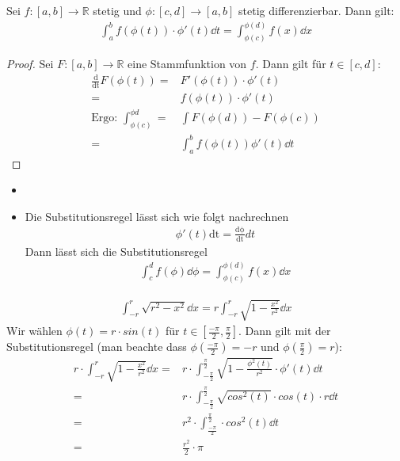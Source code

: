 \begin{Satz}{\label{vl_12_satz_04}
	Sei $f: [a,b] \rightarrow \mathbb{R}$ stetig und $\phi: [c,d] \rightarrow [a,b]$ 
	stetig differenzierbar. Dann gilt:
	\begin{align*}
		\int_a^b f(\phi(t))\cdot\phi'(t)\dd{t} = \int_{\phi(c)}^{\phi(d)} 
		f(x) \dd{x}
	\end{align*}	 
}\end{Satz}


\begin{proof}
	Sei $F : [a,b] \rightarrow \mathbb{R}$ eine Stammfunktion von $f$. Dann gilt für 
	$t \in [c,d]$:
	\begin{align*}
		\frac{\mathrm{d}}{\mathrm{dt}}F(\phi(t)) = &  F'(\phi(t)) \cdot \phi'(t) \\
		= & f(\phi(t))\cdot \phi'(t) \\
		\text{Ergo: } \int_{\phi(c)}^{\phi{d}} = & \int F(\phi(d))-F(\phi(c)) \\
		= & \int_a^b f(\phi(t)) \phi'(t) \dd{t}
	\end{align*}
\end{proof}

\begin{Bemerkung}{
	\begin{itemize}
		\item[ ]
		\item Die Substitutionsregel lässt sich wie folgt nachrechnen
		\begin{align*}
			\phi'(t)\mathrm{dt} = \frac{\mathrm{d\phi}}{\mathrm{dt}}dt
		\end{align*}
		Dann lässt sich die Substitutionsregel
		\begin{align*}
			\int_c^d f(\phi) \dd{\phi} = \int_{\phi(c)}^{\phi(d)} f(x) \dd{x}
		\end{align*}
	\end{itemize}
}\end{Bemerkung}

\begin{Beispiel}{
	\begin{align*}
		\int_{-r}^r \sqrt{r^2 -x^2} \dd{x} = r \int_{-r}^r 
		\sqrt{1 - \frac{x^2}{r^2}} \dd{x}
	\end{align*}
	Wir wählen $\phi(t) = r \cdot sin(t)$ für $ t \in [\frac{-\pi}{2}, \frac{\pi}{2}]$. 
	Dann gilt mit der Substitutionsregel 
	(man beachte dass $\phi(\frac{-\pi}{2}) = -r 
	$ und $\phi(\frac{\pi}{2}) = r$):
	\begin{align*}
		r \cdot \int_{-r}^r \sqrt{1 - \frac{x^2}{r^2}} \dd{x} = & r 
			\cdot \int_{-\frac{\pi}{2}}^{\frac{\pi}{2}} 
			\sqrt{1 - \frac{\phi^2(t)}{r^2}} \cdot \phi'(t) \dd{t} \\
		= & r \cdot \int_{-\frac{\pi}{2}}^{\frac{\pi}{2}} 
			\sqrt{cos^2(t)} \cdot cos(t) \cdot r\dd{t} \\
		= & r^2 \cdot \int_{\frac{-\pi}{2}}^{\frac{\pi}{2}} \cdot cos^2(t)\dd{t} \\
		= & \frac{r^2}{2} \cdot \pi
	\end{align*}	 
}\end{Beispiel}

